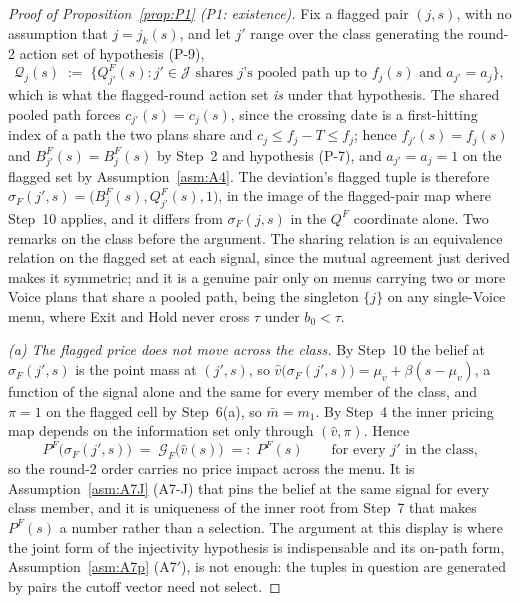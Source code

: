 \documentclass[11pt]{article}
\begin{document}
\begin{proof}[Proof of Proposition~\ref{prop:P1} (P1: existence)]
Fix a flagged pair $(j,s)$, with no assumption that $j = j_k(s)$, and let $j'$ range over the class
generating the round-2 action set of hypothesis (P-9),
\[
\mathcal Q_j(s) \;:=\; \bigl\{Q_{j'}^F(s) : j' \in \mathcal J \text{ shares } j\text{'s pooled path up
to } f_j(s) \text{ and } a_{j'} = a_j\bigr\},
\]
which is what the flagged-round action set \emph{is} under that hypothesis. The shared pooled path
forces $c_{j'}(s) = c_j(s)$, since the crossing date is a first-hitting index of a path the two
plans share and $c_j \le f_j - T \le f_j$; hence $f_{j'}(s) = f_j(s)$ and $B_{j'}^F(s) = B_j^F(s)$ by
Step~2 and hypothesis (P-7), and $a_{j'} = a_j = 1$ on the flagged set by Assumption~\ref{asm:A4}.
The deviation's flagged tuple is therefore $\sigma_F(j',s) = \bigl(B_j^F(s),Q_{j'}^F(s),1\bigr)$,
in the image of the flagged-pair map where Step~10 applies, and it differs from
$\sigma_F(j,s)$ in the $Q^F$ coordinate alone. Two remarks on the class before the argument. The
sharing relation is an equivalence relation on the flagged set at each signal, since the mutual
agreement just derived makes it symmetric; and it is a genuine pair only on menus carrying two or
more Voice plans that share a pooled path, being the singleton $\{j\}$ on any single-Voice menu,
where Exit and Hold never cross $\tau$ under $b_0 < \tau$.

\emph{(a) The flagged price does not move across the class.} By Step~10 the belief at
$\sigma_F(j',s)$ is the point mass at $(j',s)$, so
$\hat v\bigl(\sigma_F(j',s)\bigr) = \mu_v + \beta(s-\mu_v)$, a function of the signal alone and the
same for every member of the class, and $\pi = 1$ on the flagged cell by Step~6(a), so
$\bar m = m_1$. By Step~4 the inner pricing map depends on the information set only through
$(\hat v,\pi)$. Hence
\begin{equation}
\label{eq:P1-PFinv}
P^F\bigl(\sigma_F(j',s)\bigr) \;=\; \mathcal G_F\bigl(\hat v(s)\bigr) \;=:\; P^F(s)
\qquad \text{for every } j' \text{ in the class,}
\end{equation}
so the round-2 order carries no price impact across the menu. It is Assumption~\ref{asm:A7J} (A7-J) that
pins the belief at the same signal for every class member, and it is uniqueness of the inner root
from Step~7 that makes $P^F(s)$ a number rather than a selection. The argument at this display is
where the joint form of the injectivity hypothesis is indispensable and its on-path form,
Assumption~\ref{asm:A7p} (A7$'$), is not enough: the tuples in question are generated by pairs the cutoff
vector need not select.


\end{proof}
\end{document}
